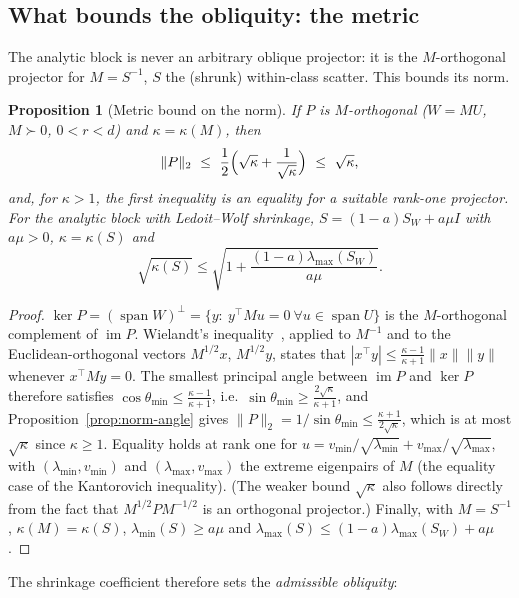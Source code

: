 \documentclass[11pt,a4paper]{article}
\theoremstyle{plain}
\newtheorem{proposition}{Proposition}
\theoremstyle{definition}
\theoremstyle{remark}
\newcommand{\im}{\operatorname{im}}
\newcommand{\spn}{\operatorname{span}}
\newcommand{\T}{\top}
\begin{document}
\subsection{What bounds the obliquity: the metric}
The analytic block is never an arbitrary oblique projector: it is the
$M$-orthogonal projector for $M=S^{-1}$, $S$ the (shrunk) within-class
scatter. This bounds its norm.
\begin{proposition}[Metric bound on the norm]
\label{prop:metric-bound}
If $P$ is $M$-orthogonal ($W=MU$, $M\succ0$, $0<r<d$) and
$\kappa=\kappa(M)$, then
\begin{equation}
  \|P\|_2\ \le\ \frac12\Bigl(\sqrt{\kappa}+\frac1{\sqrt{\kappa}}\Bigr)\ \le\ \sqrt{\kappa},
  \label{eq:metric-bound}
\end{equation}
and, for $\kappa>1$, the first inequality is an equality for a suitable
rank-one projector.
For the analytic block with Ledoit--Wolf shrinkage,
$S=(1-a)S_W+a\mu I$ with $a\mu>0$, $\kappa=\kappa(S)$ and
\begin{equation}
  \sqrt{\kappa(S)}\le\sqrt{1+\frac{(1-a)\lambda_{\max}(S_W)}{a\mu}}.
  \label{eq:shrink-bound}
\end{equation}
\end{proposition}
\begin{proof}
$\ker P=(\spn W)^\perp=\{y:\ y^\T Mu=0\ \forall u\in\spn U\}$ is the
$M$-orthogonal complement of $\im P$. Wielandt's
inequality~\cite[Section~7.4]{hornjohnson2013}, applied to $M^{-1}$ and to the
Euclidean-orthogonal vectors $M^{1/2}x$, $M^{1/2}y$, states that
$|x^\T y|\le\frac{\kappa-1}{\kappa+1}\|x\|\|y\|$ whenever $x^\T My=0$. The
smallest principal angle between $\im P$ and $\ker P$ therefore satisfies
$\cos\theta_{\min}\le\frac{\kappa-1}{\kappa+1}$, i.e.\
$\sin\theta_{\min}\ge\frac{2\sqrt\kappa}{\kappa+1}$, and
Proposition~\ref{prop:norm-angle} gives
$\|P\|_2=1/\sin\theta_{\min}\le\frac{\kappa+1}{2\sqrt\kappa}$, which is at
most $\sqrt\kappa$ since $\kappa\ge1$. Equality holds at rank one for
$u=v_{\min}/\sqrt{\lambda_{\min}}+v_{\max}/\sqrt{\lambda_{\max}}$, with
$(\lambda_{\min},v_{\min})$ and $(\lambda_{\max},v_{\max})$ the extreme
eigenpairs of $M$ (the equality case of the Kantorovich inequality). (The
weaker bound $\sqrt\kappa$ also follows directly from the fact that
$M^{1/2}PM^{-1/2}$ is an orthogonal projector.) Finally, with $M=S^{-1}$,
$\kappa(M)=\kappa(S)$, $\lambda_{\min}(S)\ge a\mu$ and
$\lambda_{\max}(S)\le(1-a)\lambda_{\max}(S_W)+a\mu$.
\end{proof}
The shrinkage coefficient therefore sets the \emph{admissible obliquity}:
\end{document}
